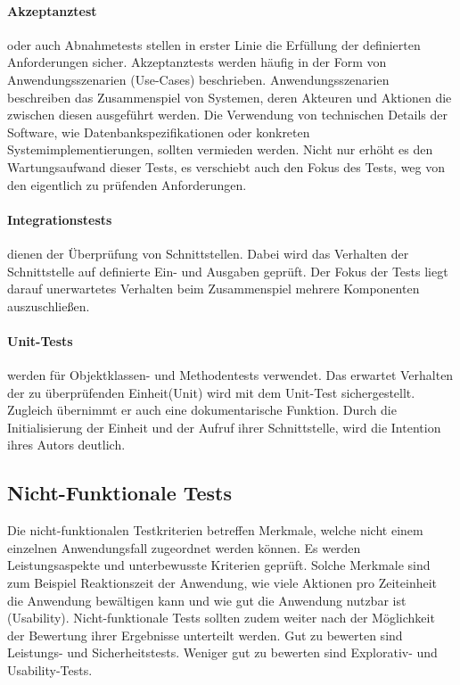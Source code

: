 \paragraph{Akzeptanztest}
oder auch Abnahmetests stellen in erster Linie die Erfüllung der definierten Anforderungen sicher. Akzeptanztests werden häufig in der Form von Anwendungsszenarien (Use-Cases) beschrieben. Anwendungsszenarien beschreiben das Zusammenspiel von Systemen, deren Akteuren und Aktionen die zwischen diesen ausgeführt werden. Die Verwendung von technischen Details der Software, wie Datenbankspezifikationen oder konkreten Systemimplementierungen, sollten vermieden werden. Nicht nur erhöht es den Wartungsaufwand dieser Tests, es verschiebt auch den Fokus des Tests, weg von den eigentlich zu prüfenden Anforderungen.

\paragraph{Integrationstests}

dienen der Überprüfung von Schnittstellen. Dabei wird das Verhalten der Schnittstelle auf definierte Ein- und Ausgaben geprüft. Der Fokus der Tests liegt darauf unerwartetes Verhalten beim Zusammenspiel mehrere Komponenten auszuschließen.

\paragraph{Unit-Tests}

werden für Objektklassen- und Methodentests verwendet. Das erwartet Verhalten der zu überprüfenden Einheit(Unit) wird mit dem Unit-Test sichergestellt. Zugleich übernimmt er auch eine dokumentarische Funktion. Durch die Initialisierung der Einheit und der Aufruf ihrer Schnittstelle, wird die Intention ihres Autors deutlich.

\subsection{Nicht-Funktionale Tests}

Die nicht-funktionalen Testkriterien betreffen Merkmale, welche nicht einem einzelnen Anwendungsfall zugeordnet werden können. Es werden Leistungsaspekte und unterbewusste Kriterien geprüft. Solche Merkmale sind zum Beispiel Reaktionszeit der Anwendung, wie viele Aktionen pro Zeiteinheit die Anwendung bewältigen kann und wie gut die Anwendung nutzbar ist (Usability). Nicht-funktionale Tests sollten zudem weiter nach der Möglichkeit der Bewertung ihrer Ergebnisse unterteilt werden. Gut zu bewerten sind Leistungs- und Sicherheitstests. Weniger gut zu bewerten sind Explorativ- und Usability-Tests.

